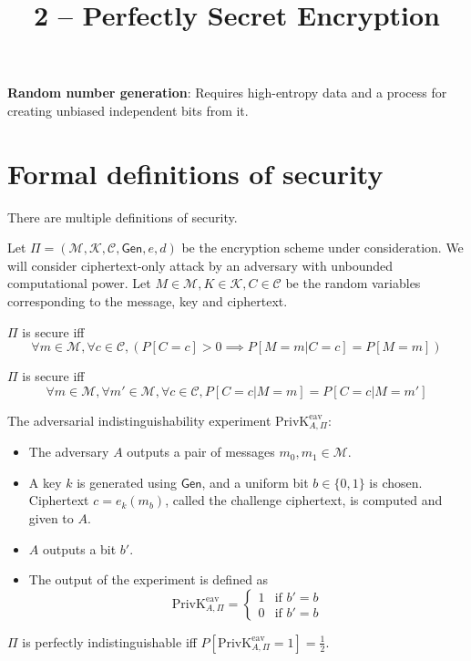 

\title{2 -- Perfectly Secret Encryption}

\newcommand*{\StdEncScheme}[1]{(\mathcal{M}, \mathcal{K}, \mathcal{C}, \textsf{Gen}, e, d)}



\maketitle
\initMinimal{}

\textbf{Random number generation}: Requires high-entropy data and a process
for creating unbiased independent bits from it.

\tableofcontents

\section{Formal definitions of security}

There are multiple definitions of security.

Let $\Pi = \StdEncScheme{}$
be the encryption scheme under consideration.
We will consider ciphertext-only attack by an adversary with unbounded computational power.
Let $M \in \mathcal{M}, K \in \mathcal{K}, C \in \mathcal{C}$
be the random variables corresponding to the message, key and ciphertext.

\begin{definition}
$\Pi$ is secure iff
\[ \forall m \in \mathcal{M}, \forall c \in \mathcal{C}, (P[C=c] > 0
\implies P[M=m|C=c] = P[M=m]) \]
\end{definition}

\begin{definition}
$\Pi$ is secure iff
\[ \forall m \in \mathcal{M}, \forall m' \in \mathcal{M}, \forall c \in \mathcal{C},
P[C=c|M=m] = P[C=c|M=m'] \]
\end{definition}

\begin{definition}
The adversarial indistinguishability experiment $\textrm{PrivK}^{\textrm{eav}}_{A,\Pi}$:
\begin{itemize}
\item The adversary $A$ outputs a pair of messages $m_0, m_1 \in \mathcal{M}$.
\item A key $k$ is generated using $\textsf{Gen}$, and a uniform bit $b \in \{0, 1\}$ is chosen.
Ciphertext $c = e_k(m_b)$, called the challenge ciphertext, is computed and given to $A$.
\item $A$ outputs a bit $b'$.
\item The output of the experiment is defined as
\[ \textrm{PrivK}^{\mathrm{eav}}_{A, \Pi}
= \begin{cases}1 & \textrm{if } b' = b \\ 0 & \textrm{if } b' = b\end{cases} \]
\end{itemize}
$\Pi$ is perfectly indistinguishable iff $P[\textrm{PrivK}^{\textrm{eav}}_{A,\Pi} = 1] = \frac{1}{2}$.
\end{definition}


